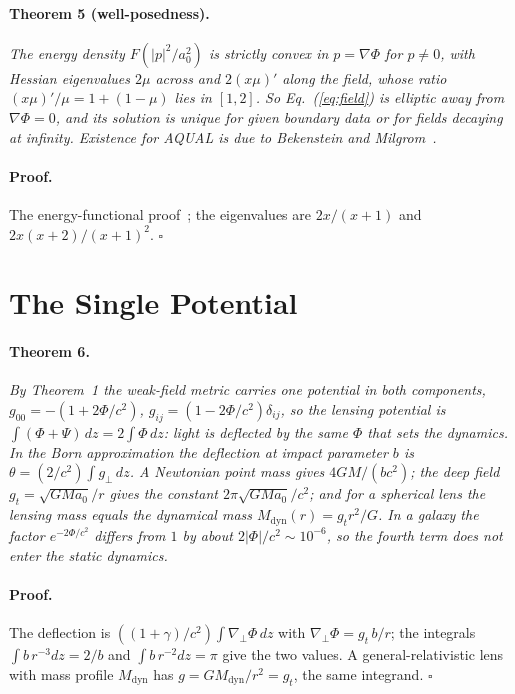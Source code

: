 \documentclass[twocolumn]{iopjournal}
\begin{document}
\paragraph{Theorem 5 (well-posedness).} \textit{The energy density
$F(|p|^2/a_0^2)$ is strictly convex in $p = \nabla\Phi$ for $p \neq 0$,
with Hessian eigenvalues $2\mu$ across and $2(x\mu)'$ along the field,
whose ratio $(x\mu)'/\mu = 1 + (1-\mu)$ lies in $[1, 2]$. So
Eq.~(\ref{eq:field}) is elliptic away from $\nabla\Phi = 0$, and its
solution is unique for given boundary data or for fields decaying at
infinity. Existence for AQUAL is due to Bekenstein and
Milgrom~\cite{BekensteinMilgrom1984}.}

\paragraph{Proof.} The energy-functional proof~\cite{NelsonPaqual};
the eigenvalues are $2x/(x+1)$ and $2x(x+2)/(x+1)^2$. \hfill $\square$


\section*{The Single Potential}

\paragraph{Theorem 6.} \textit{By Theorem~1 the weak-field metric
carries one potential in both components,
$g_{00} = -(1 + 2\Phi/c^2)$, $g_{ij} = (1 - 2\Phi/c^2)\delta_{ij}$, so the
lensing potential is $\int(\Phi + \Psi)\,dz = 2\int\Phi\,dz$: light is
deflected by the same $\Phi$ that sets the dynamics. In the Born
approximation the deflection at impact parameter $b$ is
$\theta = (2/c^2)\int g_\perp\,dz$. A Newtonian point mass gives
$4GM/(bc^2)$; the deep field $g_t = \sqrt{GMa_0}/r$ gives the constant
$2\pi\sqrt{GMa_0}/c^2$; and for a spherical lens the lensing mass equals
the dynamical mass $M_{\mathrm{dyn}}(r) = g_t r^2/G$. In a galaxy the
factor $e^{-2\Phi/c^2}$ differs from $1$ by about
$2|\Phi|/c^2 \sim 10^{-6}$, so the fourth term does not enter the
static dynamics.}

\paragraph{Proof.} The deflection is $((1+\gamma)/c^2)\int
\nabla_\perp\Phi\,dz$ with $\nabla_\perp\Phi = g_t\,b/r$; the integrals
$\int b\,r^{-3}dz = 2/b$ and $\int b\,r^{-2}dz = \pi$ give the two
values. A general-relativistic lens with mass profile $M_{\mathrm{dyn}}$
has $g = GM_{\mathrm{dyn}}/r^2 = g_t$, the same integrand.
\hfill $\square$
\end{document}
